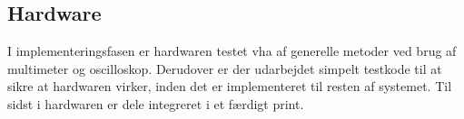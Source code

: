 \subsection{Hardware}
I implementeringsfasen er hardwaren testet vha af generelle metoder ved brug af multimeter og oscilloskop. Derudover er der udarbejdet simpelt testkode til at sikre at hardwaren virker, inden det er implementeret til resten af systemet. Til sidst i hardwaren er dele integreret i et færdigt print. 
%
%
